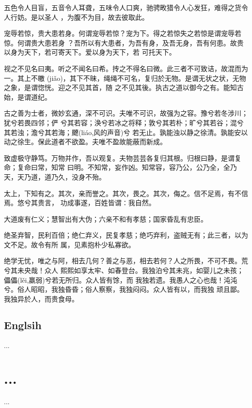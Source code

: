 \documentclass[11pt,a4paper,extrafontsizes,oldfontcommands,twoside]{dlutthesis}
\begin{document}
五色令人目盲，五音令人耳聋，五味令人口爽，驰骋畋猎令人心发狂，难得之货令人行妨。是以圣人
，为腹不为目，故去彼取此。

宠辱若惊，贵大患若身。何谓宠辱若惊？宠为下。得之若惊失之若惊是谓宠辱若惊。何谓贵大患若身
？吾所以有大患者，为吾有身，及吾无身，吾有何患。故贵以身为天下，若可寄天下。爱以身为天下，若
可托天下。

视之不见名曰夷。听之不闻名曰希。抟之不得名曰微。此三者不可致诘，故混而为一。其上不皦
(jiǎo)，其下不昧，绳绳不可名，复归於无物。是谓无状之状，无物之象，是谓惚恍。迎之不见其首，随
之不见其後。执古之道以御今之有。能知古始，是谓道纪。

古之善为士者，微妙玄通，深不可识。夫唯不可识，故强为之容。豫兮若冬涉川；犹兮若畏四邻；俨
兮其若容；涣兮若冰之将释；敦兮其若朴；旷兮其若谷；混兮其若浊；澹兮其若海；飉(liáo,风的声音)兮
若无止。孰能浊以静之徐清。孰能安以动之徐生。保此道者不欲盈。夫唯不盈故能蔽而新成。

致虚极守静笃。万物并作，吾以观复。夫物芸芸各复归其根。归根曰静，是谓复命；复命曰常，知常
曰明。不知常，妄作凶。知常容，容乃公，公乃全，全乃天，天乃道，道乃久，没身不殆。

太上，下知有之。其次，亲而誉之。其次，畏之。其次，侮之。信不足焉，有不信焉。悠兮其贵言，
功成事遂，百姓皆谓∶我自然。

大道废有仁义；慧智出有大伪；六亲不和有孝慈；国家昏乱有忠臣。

绝圣弃智，民利百倍；绝仁弃义，民复孝慈；绝巧弃利，盗贼无有；此三者，以为文不足。故令有所
属，见素抱朴少私寡欲。

绝学无忧，唯之与阿，相去几何？善之与恶，相去若何？人之所畏，不可不畏。荒兮其未央哉！众人
熙熙如享太牢、如春登台。我独泊兮其未兆，如婴儿之未孩；儡儡(lěi,羸弱)兮若无所归。众人皆有馀，而
我独若遗。我愚人之心也哉！沌沌兮。俗人昭昭，我独昏昏；俗人察察，我独闷闷。众人皆有以，而我独
顽且鄙。我独异於人，而贵食母。

\section{Englsih}
\label{sec:englsih}

\lipsum[1-9]

\printpagenotes
\begin{thebibliography}...\end{thebibliography}
\appendix
\chapter{...}
...
\end{document}
